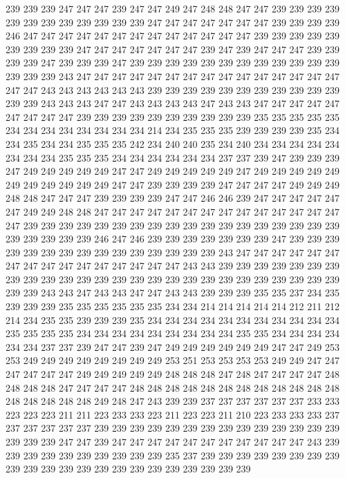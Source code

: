 239 239 239 247 247 247 239 247 247 249 247 248 248 247 247 239 239 239 239 239
239 239 239 239 239 239 239 247 247 247 247 247 247 247 239 239 239 239 246 247
247 247 247 247 247 247 247 247 247 247 247 247 239 239 239 239 239 239 239 239
239 247 247 247 247 247 247 247 239 247 239 247 247 247 239 239 239 239 247 239
239 239 247 239 239 239 239 239 239 239 239 239 239 239 239 239 239 239 243 247
247 247 247 247 247 247 247 247 247 247 247 247 247 247 247 247 243 243 243 243
243 243 239 239 239 239 239 239 239 239 239 239 239 239 239 243 243 243 247 247
243 243 243 243 247 243 243 247 247 247 247 247 247 247 247 247 239 239 239 239
239 239 239 239 239 239 235 235 235 235 235 234 234 234 234 234 234 234 234 214
234 235 235 235 239 239 239 239 235 234 234 235 234 234 235 235 235 242 234 240
240 235 234 240 234 234 234 234 234 234 234 234 235 235 235 234 234 234 234 234
234 237 237 239 247 239 239 239 247 249 249 249 249 249 247 247 249 249 249 249
249 247 249 249 249 249 249 249 249 249 249 249 249 247 247 239 239 239 239 247
247 247 247 249 249 249 248 248 247 247 247 239 239 239 239 247 247 246 246 239
247 247 247 247 247 247 249 249 248 248 247 247 247 247 247 247 247 247 247 247
247 247 247 247 247 239 239 239 239 239 239 239 239 239 239 239 239 239 239 239
239 239 239 239 239 239 239 239 246 247 246 239 239 239 239 239 239 239 247 239
239 239 239 239 239 239 239 239 239 239 239 239 239 239 243 247 247 247 247 247
247 247 247 247 247 247 247 247 247 247 247 243 243 239 239 239 239 239 239 239
239 239 239 239 239 239 239 239 239 239 239 239 239 239 239 239 239 239 239 239
239 243 243 247 243 243 247 247 243 243 239 239 239 235 235 237 234 235 239 239
239 235 235 235 235 235 235 234 234 214 214 214 214 214 212 211 212 214 234 235
235 239 239 239 235 234 234 234 234 234 234 234 234 234 234 234 235 235 235 235
234 234 234 234 234 234 234 234 234 235 235 234 234 234 234 234 234 237 237 239
247 247 239 247 249 249 249 249 249 249 247 247 249 253 253 249 249 249 249 249
249 249 249 253 251 253 253 253 253 249 249 247 247 247 247 247 247 249 249 249
249 249 248 248 248 247 248 247 247 247 247 248 248 248 248 247 247 247 247 248
248 248 248 248 248 248 248 248 248 248 248 248 248 248 248 248 249 248 247 243
239 239 237 237 237 237 237 237 233 233 223 223 223 211 211 223 233 233 223 211
223 223 211 210 223 233 233 233 237 237 237 237 237 237 239 239 239 239 239 239
239 239 239 239 239 239 239 239 239 239 239 247 247 239 247 247 247 247 247 247
247 247 247 247 247 243 239 239 239 239 239 239 239 239 239 239 235 237 239 239
239 239 239 239 239 239 239 239 239 239 239 239 239 239 239 239 239 239 239 239
